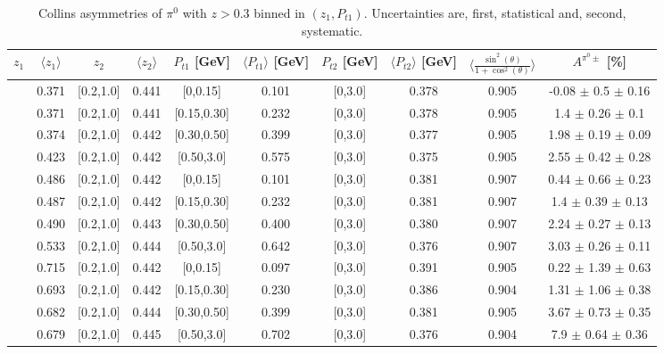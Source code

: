 \begin{table}[H]\tiny
\centering
\begin{tabular}{|c| c| c| c| c| c| c| c| c| c|}
\hline
$z_1$& $\langle  z_{1}  \rangle$ & $z_2$ & $\langle  z_{2}\rangle$& $P_{t1}$ [GeV] & $\langle  P_{t1} \rangle$ [GeV] & $P_{t2}$ [GeV] &  $\langle P_{t2}\rangle$ [GeV] &$\langle\frac{\sin^2(\theta)}{1+\cos^2(\theta)}\rangle$& $A^{\pi^0\pm}$ [\%]   \\ \hline
[0.3,0.5]	&	0.371	&	[0.2,1.0]	&	0.441	&	[0,0.15]	&	0.101	&	[0,3.0]	&	0.378	&	0.905	& -0.08  $\pm$ 0.5  $\pm$ 0.16     \\ \hline
[0.3,0.5]	&	0.371	&	[0.2,1.0]	&	0.441	&	[0.15,0.30]	&	0.232	&	[0,3.0]	&	0.378	&	0.905	& 1.4  $\pm$ 0.26  $\pm$ 0.1       \\ \hline
[0.3,0.5]	&	0.374	&	[0.2,1.0]	&	0.442	&	[0.30,0.50]	&	0.399	&	[0,3.0]	&	0.377	&	0.905	& 1.98  $\pm$ 0.19  $\pm$ 0.09     \\ \hline
[0.3,0.5]	&	0.423	&	[0.2,1.0]	&	0.442	&	[0.50,3.0]	&	0.575	&	[0,3.0]	&	0.375	&	0.905	& 2.55  $\pm$ 0.42  $\pm$ 0.28     \\ \hline
\hline
[0.5,0.7]	&	0.486	&	[0.2,1.0]	&	0.442	&	[0,0.15]	&	0.101	&	[0,3.0]	&	0.381	&	0.907	& 0.44  $\pm$ 0.66  $\pm$ 0.23     \\ \hline
[0.5,0.7]	&	0.487	&	[0.2,1.0]	&	0.442	&	[0.15,0.30]	&	0.232	&	[0,3.0]	&	0.381	&	0.907	& 1.4  $\pm$ 0.39  $\pm$ 0.13      \\ \hline
[0.5,0.7]	&	0.490	&	[0.2,1.0]	&	0.443	&	[0.30,0.50]	&	0.400	&	[0,3.0]	&	0.380	&	0.907	& 2.24  $\pm$ 0.27  $\pm$ 0.13     \\ \hline
[0.5,0.7]	&	0.533	&	[0.2,1.0]	&	0.444	&	[0.50,3.0]	&	0.642	&	[0,3.0]	&	0.376	&	0.907	& 3.03  $\pm$ 0.26  $\pm$ 0.11     \\ \hline
\hline
[0.7,1.0]	&	0.715	&	[0.2,1.0]	&	0.442	&	[0,0.15]	&	0.097	&	[0,3.0]	&	0.391	&	0.905	& 0.22  $\pm$ 1.39  $\pm$ 0.63     \\ \hline
[0.7,1.0]	&	0.693	&	[0.2,1.0]	&	0.442	&	[0.15,0.30]	&	0.230	&	[0,3.0]	&	0.386	&	0.904	& 1.31  $\pm$ 1.06  $\pm$ 0.38     \\ \hline
[0.7,1.0]	&	0.682	&	[0.2,1.0]	&	0.444	&	[0.30,0.50]	&	0.399	&	[0,3.0]	&	0.381	&	0.905	& 3.67  $\pm$ 0.73  $\pm$ 0.35     \\ \hline
[0.7,1.0]	&	0.679	&	[0.2,1.0]	&	0.445	&	[0.50,3.0]	&	0.702	&	[0,3.0]	&	0.376	&	0.904	& 7.9  $\pm$ 0.64  $\pm$ 0.36   	\\ \hline
\end{tabular}
\caption[Collins asymmetries of $\pi^0$ with $z>0.3$ binned in $(z_{1},P_{t1})$]{Collins asymmetries of $\pi^0$ with $z>0.3$ binned in $(z_{1},P_{t1})$. Uncertainties are, first, statistical and, second, systematic.}
\label{tab:finaletaptbins}
\end{table}

